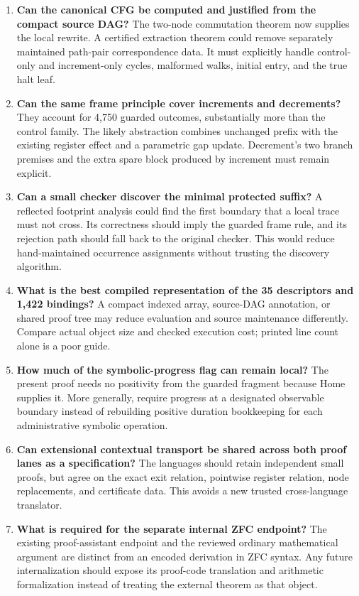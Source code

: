 \documentclass[11pt,letterpaper]{article}
\theoremstyle{definition}
\begin{document}
\begin{enumerate}
\item \textbf{Can the canonical CFG be computed and justified from the compact
source DAG?} The two-node commutation theorem now supplies the local rewrite.
A certified extraction theorem could remove separately maintained path-pair
correspondence data. It must explicitly handle control-only and increment-only
cycles, malformed walks, initial entry, and the true halt leaf.
\item \textbf{Can the same frame principle cover increments and decrements?}
They account for 4,750 guarded outcomes, substantially more than the control
family. The likely abstraction combines unchanged prefix with the existing
register effect and a parametric gap update. Decrement's two branch premises
and the extra spare block produced by increment must remain explicit.
\item \textbf{Can a small checker discover the minimal protected suffix?}
A reflected footprint analysis could find the first boundary that a local
trace must not cross. Its correctness should imply the guarded frame rule,
and its rejection path should fall back to the original checker. This would
reduce hand-maintained occurrence assignments without trusting the discovery
algorithm.
\item \textbf{What is the best compiled representation of the 35 descriptors
and 1,422 bindings?} A compact indexed array, source-DAG annotation, or shared
proof tree may reduce evaluation and source maintenance differently. Compare
actual object size and checked execution cost; printed line count alone is a
poor guide.
\item \textbf{How much of the symbolic-progress flag can remain local?}
The present proof needs no positivity from the guarded fragment because Home
supplies it. More generally, require progress at a designated observable
boundary instead of rebuilding positive duration bookkeeping for each
administrative symbolic operation.
\item \textbf{Can extensional contextual transport be shared across both proof
lanes as a specification?} The languages should retain independent small
proofs, but agree on the exact exit relation, pointwise register relation,
node replacements, and certificate data. This avoids a new trusted
cross-language translator.
\item \textbf{What is required for the separate internal ZFC endpoint?}
The existing proof-assistant endpoint and the reviewed ordinary mathematical
argument are distinct from an encoded derivation in ZFC syntax. Any future
internalization should expose its proof-code translation and arithmetic
formalization instead of treating the external theorem as that object.
\end{enumerate}
\end{document}
